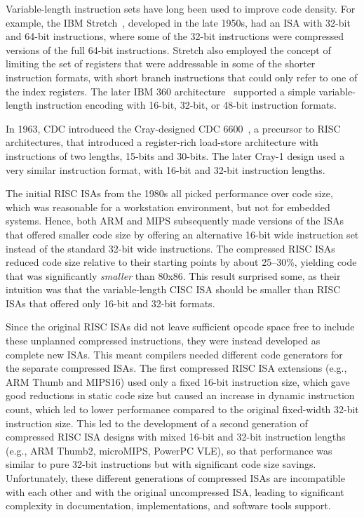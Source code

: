 \begin{commentary}
Variable-length instruction sets have long been used to improve code
density.  For example, the IBM Stretch~\cite{stretch}, developed in
the late 1950s, had an ISA with 32-bit and 64-bit instructions, where
some of the 32-bit instructions were compressed versions of the full
64-bit instructions.  Stretch also employed the concept of limiting
the set of registers that were addressable in some of the shorter
instruction formats, with short branch instructions that could only
refer to one of the index registers.  The later IBM 360
architecture~\cite{ibm360} supported a simple variable-length
instruction encoding with 16-bit, 32-bit, or 48-bit instruction
formats.

In 1963, CDC introduced the Cray-designed CDC 6600~\cite{cdc6600}, a
precursor to RISC architectures, that introduced a register-rich
load-store architecture with instructions of two lengths, 15-bits and
30-bits.  The later Cray-1 design used a very similar instruction
format, with 16-bit and 32-bit instruction lengths.

The initial RISC ISAs from the 1980s all picked performance over code
size, which was reasonable for a workstation environment, but not for
embedded systems. Hence, both ARM and MIPS subsequently made versions
of the ISAs that offered smaller code size by offering an alternative
16-bit wide instruction set instead of the standard 32-bit wide
instructions.  The compressed RISC ISAs reduced code size relative to
their starting points by about 25--30\%, yielding code that was
significantly \emph{smaller} than 80x86.  This result surprised some,
as their intuition was that the variable-length CISC ISA should be
smaller than RISC ISAs that offered only 16-bit and 32-bit formats.

Since the original RISC ISAs did not leave sufficient opcode space
free to include these unplanned compressed instructions, they were
instead developed as complete new ISAs.  This meant compilers needed
different code generators for the separate compressed ISAs.  The first
compressed RISC ISA extensions (e.g., ARM Thumb and MIPS16) used only
a fixed 16-bit instruction size, which gave good reductions in static
code size but caused an increase in dynamic instruction count, which
led to lower performance compared to the original fixed-width 32-bit
instruction size.  This led to the development of a second generation
of compressed RISC ISA designs with mixed 16-bit and 32-bit
instruction lengths (e.g., ARM Thumb2, microMIPS, PowerPC VLE), so
that performance was similar to pure 32-bit instructions but with
significant code size savings.  Unfortunately, these different
generations of compressed ISAs are incompatible with each other and
with the original uncompressed ISA, leading to significant complexity
in documentation, implementations, and software tools support.


\end{commentary}
